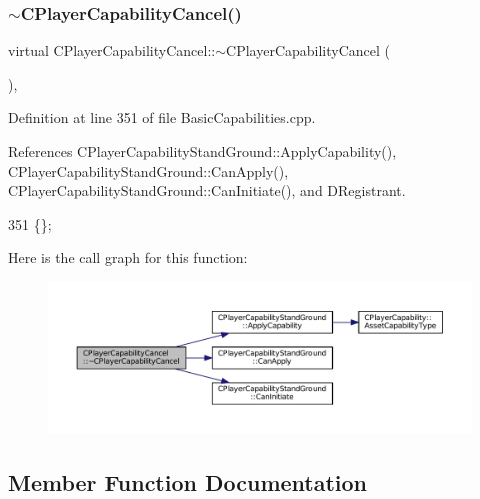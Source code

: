 \subsubsection{\texorpdfstring{$\sim$\+C\+Player\+Capability\+Cancel()}{~CPlayerCapabilityCancel()}}
{\footnotesize\ttfamily virtual C\+Player\+Capability\+Cancel\+::$\sim$\+C\+Player\+Capability\+Cancel (\begin{DoxyParamCaption}{ }\end{DoxyParamCaption})\hspace{0.3cm}{\ttfamily [inline]}, {\ttfamily [virtual]}}



Definition at line 351 of file Basic\+Capabilities.\+cpp.



References C\+Player\+Capability\+Stand\+Ground\+::\+Apply\+Capability(), C\+Player\+Capability\+Stand\+Ground\+::\+Can\+Apply(), C\+Player\+Capability\+Stand\+Ground\+::\+Can\+Initiate(), and D\+Registrant.


\begin{DoxyCode}
351 \{\};
\end{DoxyCode}
Here is the call graph for this function\+:\nopagebreak
\begin{figure}[H]
\begin{center}
\leavevmode
\includegraphics[width=350pt]{classCPlayerCapabilityCancel_a354db8bd423b9bf6959de288177db049_cgraph}
\end{center}
\end{figure}


\subsection{Member Function Documentation}
\hypertarget{classCPlayerCapabilityCancel_a8f738ac375bf5d1e7f8b768bce16b946}{}\label{classCPlayerCapabilityCancel_a8f738ac375bf5d1e7f8b768bce16b946} 
